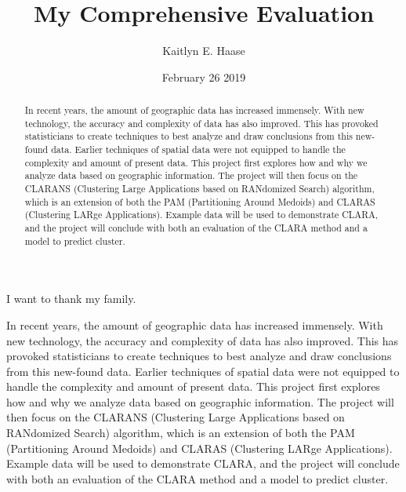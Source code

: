 \documentclass[12pt,twoside]{amherstthesis}
\title{My Comprehensive Evaluation}
\author{Kaitlyn E. Haase}
\date{February 26 2019}
\begin{document}
      \maketitle
  
  \frontmatter %
  \pagestyle{empty} %

      \begin{acknowledgements}
      I want to thank my family.
    \end{acknowledgements}
  
  

      \hypersetup{linkcolor=black}
    \setcounter{tocdepth}{2}
    \tableofcontents
  
      \listoftables
  
      \listoffigures
  
      \begin{abstract}
      In recent years, the amount of geographic data has increased immensely.
      With new technology, the accuracy and complexity of data has also
      improved. This has provoked statisticians to create techniques to best
      analyze and draw conclusions from this new-found data. Earlier
      techniques of spatial data were not equipped to handle the complexity
      and amount of present data. This project first explores how and why we
      analyze data based on geographic information. The project will then
      focus on the CLARANS (Clustering Large Applications based on RANdomized
      Search) algorithm, which is an extension of both the PAM (Partitioning
      Around Medoids) and CLARAS (Clustering LARge Applications). Example data
      will be used to demonstrate CLARA, and the project will conclude with
      both an evaluation of the CLARA method and a model to predict cluster.
    \end{abstract}
  
  
  \mainmatter %
  \pagestyle{fancyplain} %

  In recent years, the amount of geographic data has increased immensely.
  With new technology, the accuracy and complexity of data has also
  improved. This has provoked statisticians to create techniques to best
  analyze and draw conclusions from this new-found data. Earlier
  techniques of spatial data were not equipped to handle the complexity
  and amount of present data. This project first explores how and why we
  analyze data based on geographic information. The project will then
  focus on the CLARANS (Clustering Large Applications based on RANdomized
  Search) algorithm, which is an extension of both the PAM (Partitioning
  Around Medoids) and CLARAS (Clustering LARge Applications). Example data
  will be used to demonstrate CLARA, and the project will conclude with
  both an evaluation of the CLARA method and a model to predict cluster.
  
\end{document}
